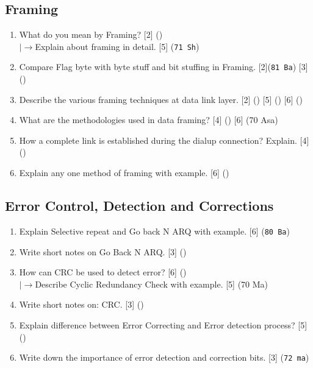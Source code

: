 \documentclass[12pt]{article}
\newcommand{\lb}{\\$\left|\rightarrow\right.$}
\begin{document}
	\subsection{Framing}
		\begin{enumerate}[noitemsep, topsep=0pt]
			\item What do you mean by Framing? \hfill [2] () 
			\lb Explain about framing in detail. \hfill [5] (\texttt{71 Sh})

			\item Compare Flag byte with byte stuff and bit stuffing in Framing. \hfill [2](\texttt{81 Ba}) [3] () 

			\item Describe the various framing techniques at data link layer. \hfill [2] () [5] () [6] ()

			\item What are the methodologies used in data framing? \hfill [4] () [6] (70 Asa)

			\item How a complete link is established during the dialup connection? Explain. \hfill[4] ()

			\item Explain any one method of framing with example. \hfill [6] ()
		\end{enumerate}

	\subsection{Error Control, Detection and Corrections}
		\begin{enumerate}[noitemsep, topsep=0pt]
			\item Explain Selective repeat and Go back N ARQ with example. \hfill [6] (\texttt{80 Ba})

			\item Write short notes on Go Back N ARQ. \hfill [3] ()

			\item How can CRC be used to detect error? \hfill [6] ()
			\lb Describe Cyclic Redundancy Check with example. \hfill [5] (70 Ma)

			\item Write short notes on: CRC. \hfill [3] ()

			\item Explain difference between Error Correcting and Error detection process? \hfill [5] ()

			\item Write down the importance of error detection and correction bits. \hfill [3] (\texttt{72 ma})
		\end{enumerate}
\end{document}
